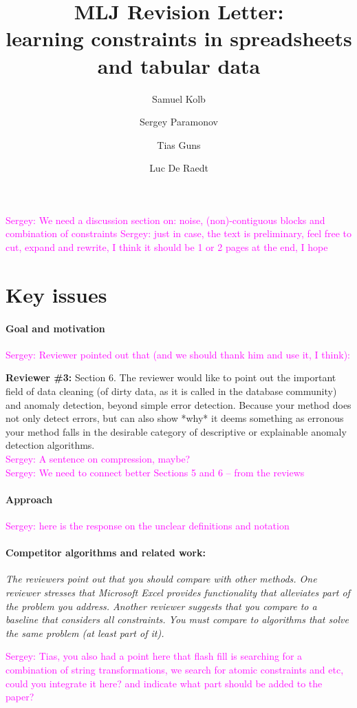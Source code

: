 \documentclass{article}
\author{Samuel Kolb \and Sergey Paramonov \and Tias Guns \and Luc {De Raedt}}
\title{MLJ Revision Letter:\\ learning constraints in spreadsheets and tabular data}
\newcommand{\sergey}[1]{\textcolor{magenta}{{\sc Sergey:} #1}\xspace}
\begin{document}
\maketitle
\sergey{We need a discussion section on: noise, (non)-contiguous blocks and combination of constraints} 
\sergey{just in case, the text is preliminary, feel free to cut, expand and rewrite, I think it should be 1 or 2 pages at the end, I hope}
\section{Key issues}

\paragraph{Goal and motivation}
\sergey{Reviewer pointed out that (and we should thank him and use it, I think):}

\textbf{Reviewer \#3:}
Section 6. The reviewer would like to point out the important field of data cleaning (of dirty data, as it is called in the database community) and anomaly detection, beyond simple error detection. Because your method does not only detect errors, but can also show *why* it deems something as erronous your method falls in the desirable category of descriptive or explainable anomaly detection algorithms.\\
\sergey{A sentence on compression, maybe?}\\
\sergey{We need to connect better Sections 5 and 6 -- from the reviews}

\paragraph{Approach}
\sergey{here is the response on the unclear definitions and notation}

\paragraph{Competitor algorithms and related work:} \textit{The reviewers point out that you should compare with other methods. One reviewer stresses that Microsoft Excel provides functionality that alleviates part of the problem you address. Another reviewer suggests that you compare to a baseline that considers all constraints. You must compare to algorithms that solve the same problem (at least part of it).}

\sergey{Tias, you also had a point here that flash fill is searching for a combination of string transformations, we search for atomic constraints and etc, could you integrate it here? and indicate what part should be added to the paper?}
\end{document}
